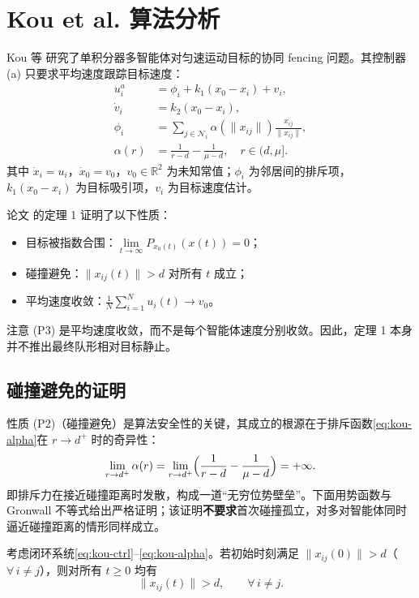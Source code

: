 
\section{Kou et al.\cite{kouCooperativeFencingControl2022} 算法分析}

Kou 等\cite{kouCooperativeFencingControl2022} 研究了单积分器多智能体对匀速运动目标的协同 fencing 问题。其控制器 (a) 只要求平均速度跟踪目标速度：
\begin{align}
u_i^a &= \phi_i + k_1 (x_0 - x_i) + v_i, \label{eq:kou-ctrl} \\
\dot{v}_i &= k_2 (x_0 - x_i), \label{eq:kou-adapt} \\
\phi_i &= \sum_{j \in \mathcal{N}_i} \alpha(\|x_{ij}\|) \frac{x_{ij}}{\|x_{ij}\|}, \label{eq:kou-phi} \\
\alpha(r) &= \frac{1}{r - d} - \frac{1}{\mu - d}, \quad r \in (d, \mu]. \label{eq:kou-alpha}
\end{align}
其中 $\dot{x}_i=u_i$，$\dot{x}_0=v_0$，$v_0\in\mathbb{R}^2$ 为未知常值；$\phi_i$ 为邻居间的排斥项，$k_1(x_0-x_i)$ 为目标吸引项，$v_i$ 为目标速度估计。

论文\cite{kouCooperativeFencingControl2022} 的定理 1 证明了以下性质：
\begin{itemize}
    \item[(P1)] 目标被指数合围：$\lim\limits_{t\to\infty} P_{x_0(t)}(x(t)) = 0$；
    \item[(P2)] 碰撞避免：$\|x_{ij}(t)\| > d$ 对所有 $t$ 成立；
    \item[(P3)] 平均速度收敛：$\frac{1}{N}\sum_{i=1}^N u_i(t) \to v_0$。
\end{itemize}
注意 (P3) 是平均速度收敛，而不是每个智能体速度分别收敛。因此，定理 1 本身并不推出最终队形相对目标静止。

\subsection{碰撞避免的证明}

性质 (P2)（碰撞避免）是算法安全性的关键，其成立的根源在于排斥函数\eqref{eq:kou-alpha}在 $r\to d^+$ 时的奇异性：
\begin{equation}
\lim_{r\to d^+}\alpha(r)
=\lim_{r\to d^+}\Bigl(\frac{1}{r-d}-\frac{1}{\mu-d}\Bigr)
=+\infty.
\end{equation}
即排斥力在接近碰撞距离时发散，构成一道``无穷位势壁垒''。下面用势函数与 Gronwall 不等式给出严格证明；该证明\textbf{不要求}首次碰撞孤立，对多对智能体同时逼近碰撞距离的情形同样成立。

\begin{theorem}[碰撞避免]
考虑闭环系统\eqref{eq:kou-ctrl}--\eqref{eq:kou-alpha}。若初始时刻满足 $\|x_{ij}(0)\|>d$（$\forall\,i\neq j$），则对所有 $t\geq 0$ 均有
\begin{equation}
\|x_{ij}(t)\|>d,\qquad \forall\,i\neq j. \label{eq:kou-collision-free}
\end{equation}
\end{theorem}

